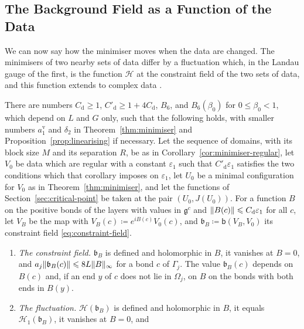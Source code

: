 \documentclass[11pt]{preprint}
\DeclarePairedDelimiter{\norm}{\lVert}{\rVert}
\numberwithin{equation}{section}
\begin{document}
\subsection{The Background Field as a Function of the Data}\label{sec:background-field}

We can now say how the minimiser moves when the data are changed. The minimisers of two nearby sets of data differ by a fluctuation which, in the Landau gauge of the first, is the function $\mathcal H$ at the constraint field of the two sets of data, and this function extends to complex data \cite[Sect.~G]{BalabanVAR}.

\begin{theorem}\label{thm:background-field}
There are numbers $C_{\mathrm d} \geqslant 1$, $C'_{\mathrm d} \geqslant 1 + 4C_{\mathrm d}$, $B_6$, and $B_6(\beta_0)$ for $0 \leqslant \beta_0 < 1$, which depend on $L$ and $G$ only, such that the following holds, with smaller numbers $a^{\mathrm v}_1$ and $\delta_2$ in Theorem~\ref{thm:minimiser} and Proposition~\ref{prop:linearising} if necessary. Let the sequence of domains, with its block size $M$ and its separation $R$, be as in Corollary~\ref{cor:minimiser-regular}, let $V_0$ be data which are regular with a constant $\varepsilon_1$ such that $C'_{\mathrm d}\varepsilon_1$ satisfies the two conditions which that corollary imposes on $\varepsilon_1$, let $U_0$ be a minimal configuration for $V_0$ as in Theorem~\ref{thm:minimiser}, and let the functions of Section~\ref{sec:critical-point} be taken at the pair $(U_0, J(U_0))$. For a function $B$ on the positive bonds of the layers with values in $\mathfrak g^c$ and $\norm{B(c)} \leqslant C_{\mathrm d}\varepsilon_1$ for all $c$, let $V_B$ be the map with $V_B(c) \coloneqq e^{iB(c)}V_0(c)$, and $\mathfrak b_B \coloneqq \mathsf b(V_B, V_0)$ its constraint field \eqref{eq:constraint-field}.
\begin{enumerate}[label=(\roman*)]
\item \emph{The constraint field.} $\mathfrak b_B$ is defined and holomorphic in $B$, it vanishes at $B = 0$, and $a_j\norm{\mathfrak b_B(c)} \leqslant 8L\norm B_\infty$ for a bond $c$ of $\Gamma_j$. The value $\mathfrak b_B(c)$ depends on $B(c)$ and, if an end $y$ of $c$ does not lie in $\Omega_j$, on $B$ on the bonds with both ends in $B(y)$.
\item \emph{The fluctuation.} $\mathcal H(\mathfrak b_B)$ is defined and holomorphic in $B$, it equals $\mathcal H_1(\mathfrak b_B)$, it vanishes at $B = 0$, and
\begin{equation}\label{eq:background-bounds}

\end{equation}
\end{enumerate}
\end{theorem}
\end{document}
